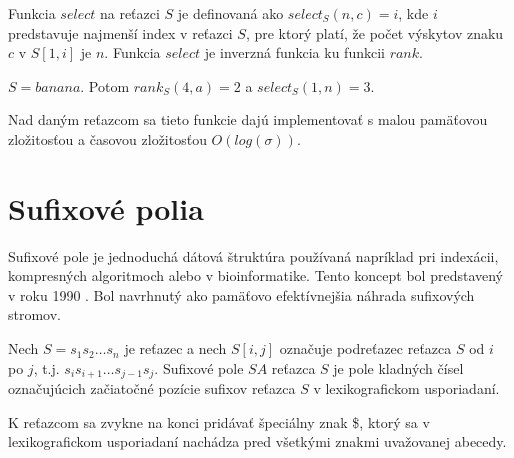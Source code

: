 \begin{defn}
    Funkcia $select$ na reťazci $S$ je definovaná ako $select_S(n, c) = i$, kde
    $i$ predstavuje najmenší index v reťazci $S$, pre ktorý platí, že počet
    výskytov znaku $c$ v $S[1, i]$ je $n$. Funkcia $select$ je inverzná funkcia
    ku funkcii $rank$.
\end{defn}

\begin{example}
    $S = banana$. Potom $rank_S(4, a) = 2$ a $select_S(1, n) = 3$.
\end{example}

Nad daným reťazcom sa tieto funkcie dajú implementovať s malou pamäťovou zložitosťou a časovou zložitosťou $O(log(\sigma))$\cite{GGV03}.


\section{Sufixové polia}

Sufixové pole je jednoduchá dátová štruktúra používaná napríklad pri indexácii,
kompresných algoritmoch alebo v bioinformatike. Tento koncept bol predstavený v
roku 1990 \cite{MM90}. Bol navrhnutý ako pamäťovo efektívnejšia náhrada
sufixových stromov.

\begin{defn}
    Nech $S = s_1 s_2 \ldots s_n$ je reťazec a nech $S[i, j]$ označuje
    podreťazec reťazca $S$ od $i$ po $j$, t.j. $s_i s_{i+1} \ldots s_{j-1} s_j$.
    Sufixové pole $SA$ reťazca $S$ je pole kladných čísel označujúcich začiatočné pozície sufixov reťazca $S$ v
    lexikografickom usporiadaní.
\end{defn}

K reťazcom sa zvykne na konci pridávať špeciálny znak \$, ktorý sa v
lexikografickom usporiadaní nachádza pred všetkými znakmi uvažovanej abecedy.

